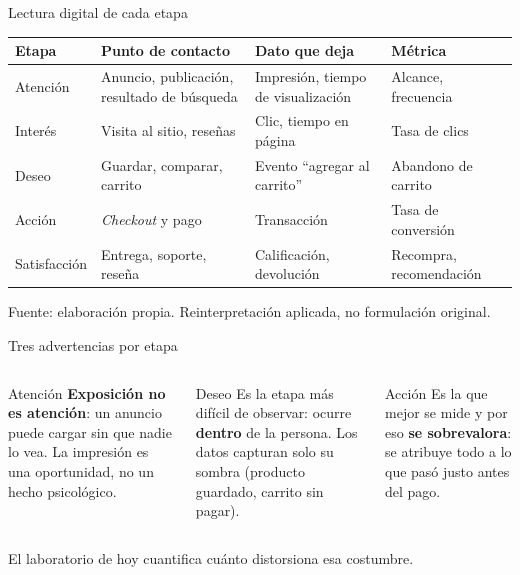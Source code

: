 \documentclass[aspectratio=169,xcolor=dvipsnames]{beamer}
\newcommand{\fuente}[1]{{\tiny\color{IPNgris}Fuente: #1}}
\begin{document}
\begin{frame}{Lectura digital de cada etapa}
\footnotesize
\begin{center}
\begin{tabular}{@{}>{\raggedright}p{1.9cm}>{\raggedright}p{3.2cm}>{\raggedright}p{3.0cm}>{\raggedright\arraybackslash}p{2.7cm}@{}}
\toprule
\textbf{Etapa} & \textbf{Punto de contacto} & \textbf{Dato que deja} & \textbf{Métrica} \\
\midrule
Atención & Anuncio, publicación, resultado de búsqueda & Impresión, tiempo de visualización & Alcance, frecuencia \\
Interés & Visita al sitio, reseñas & Clic, tiempo en página & Tasa de clics \\
Deseo & Guardar, comparar, carrito & Evento \enquote{agregar al carrito} & Abandono de carrito \\
Acción & \textit{Checkout} y pago & Transacción & Tasa de conversión \\
Satisfacción & Entrega, soporte, reseña & Calificación, devolución & Recompra, recomendación \\
\bottomrule
\end{tabular}
\end{center}
\fuente{elaboración propia. Reinterpretación aplicada, no formulación original.}
\end{frame}

\begin{frame}{Tres advertencias por etapa}
\begin{columns}[T]
  \begin{alertblock}{Atención}
    \small \textbf{Exposición no es atención}: un anuncio puede cargar sin que nadie lo vea. La impresión es una oportunidad, no un hecho psicológico.
  \end{alertblock}
  \begin{block}{Deseo}
    \small Es la etapa más difícil de observar: ocurre \textbf{dentro} de la persona. Los datos capturan solo su sombra (producto guardado, carrito sin pagar).
  \end{block}
  \begin{exampleblock}{Acción}
    \small Es la que mejor se mide y por eso \textbf{se sobrevalora}: se atribuye todo a lo que pasó justo antes del pago.
  \end{exampleblock}
\end{columns}
\vspace{6pt}
{\small\color{IPNgris} El laboratorio de hoy cuantifica cuánto distorsiona esa costumbre.}
\end{frame}
\end{document}
